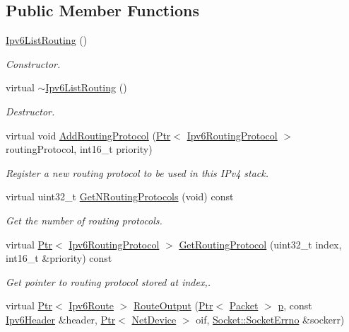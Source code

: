 \subsection*{Public Member Functions}
\begin{DoxyCompactItemize}
\item 
\hyperlink{classns3_1_1Ipv6ListRouting_aba2640dffd53164b983cf8492ca970c8}{Ipv6\+List\+Routing} ()
\begin{DoxyCompactList}\small\item\em Constructor. \end{DoxyCompactList}\item 
virtual \hyperlink{classns3_1_1Ipv6ListRouting_a045ee0b12dee4e8642ff7f1f6b86a835}{$\sim$\+Ipv6\+List\+Routing} ()
\begin{DoxyCompactList}\small\item\em Destructor. \end{DoxyCompactList}\item 
virtual void \hyperlink{classns3_1_1Ipv6ListRouting_af2f9faf061ec907349d7287475fe73bc}{Add\+Routing\+Protocol} (\hyperlink{classns3_1_1Ptr}{Ptr}$<$ \hyperlink{classns3_1_1Ipv6RoutingProtocol}{Ipv6\+Routing\+Protocol} $>$ routing\+Protocol, int16\+\_\+t priority)
\begin{DoxyCompactList}\small\item\em Register a new routing protocol to be used in this I\+Pv4 stack. \end{DoxyCompactList}\item 
virtual uint32\+\_\+t \hyperlink{classns3_1_1Ipv6ListRouting_a7aa04efd7a6833dddcebe061bcbb0e78}{Get\+N\+Routing\+Protocols} (void) const 
\begin{DoxyCompactList}\small\item\em Get the number of routing protocols. \end{DoxyCompactList}\item 
virtual \hyperlink{classns3_1_1Ptr}{Ptr}$<$ \hyperlink{classns3_1_1Ipv6RoutingProtocol}{Ipv6\+Routing\+Protocol} $>$ \hyperlink{classns3_1_1Ipv6ListRouting_ac57acbccab04b57ffb62a8bd9d40d506}{Get\+Routing\+Protocol} (uint32\+\_\+t index, int16\+\_\+t \&priority) const 
\begin{DoxyCompactList}\small\item\em Get pointer to routing protocol stored at index,. \end{DoxyCompactList}\item 
virtual \hyperlink{classns3_1_1Ptr}{Ptr}$<$ \hyperlink{classns3_1_1Ipv6Route}{Ipv6\+Route} $>$ \hyperlink{classns3_1_1Ipv6ListRouting_a17dd6df1ef25f2ff410b5ba759b6e5e7}{Route\+Output} (\hyperlink{classns3_1_1Ptr}{Ptr}$<$ \hyperlink{classns3_1_1Packet}{Packet} $>$ \hyperlink{lte__link__budget__x2__handover__measures_8m_ac9de518908a968428863f829398a4e62}{p}, const \hyperlink{classns3_1_1Ipv6Header}{Ipv6\+Header} \&header, \hyperlink{classns3_1_1Ptr}{Ptr}$<$ \hyperlink{classns3_1_1NetDevice}{Net\+Device} $>$ oif, \hyperlink{classns3_1_1Socket_ada1328c5ae0c28cb2a982caf8f6d6cca}{Socket\+::\+Socket\+Errno} \&sockerr)

\end{DoxyCompactItemize}
